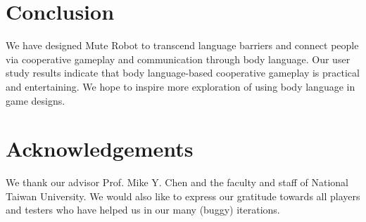 \documentclass{chi-ext}
\begin{document}
\section{Conclusion}
We have designed Mute Robot to transcend language barriers and connect people via cooperative gameplay and communication through body language.
Our user study results indicate that body language-based cooperative gameplay is practical and entertaining.
We hope to inspire more exploration of using body language in game designs.




\section{Acknowledgements}
We thank our advisor Prof. Mike Y. Chen and the faculty and staff of National Taiwan University.
We would also like to express our gratitude towards all players and testers who have helped us in our many (buggy) iterations. 



\balance


\end{document}
